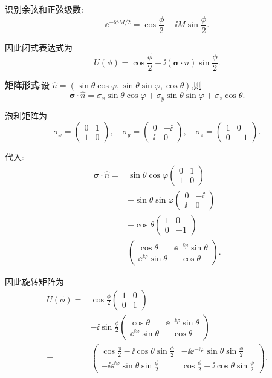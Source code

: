 \begin{question}
\begin{solution}
	识别余弦和正弦级数:
	\[
	\ee^{-\ii\phi M/2} = \cos\frac{\phi}{2} - \ii M\sin\frac{\phi}{2}.
	\]

	因此闭式表达式为
	\[
	\boxed{U(\phi) = \cos\frac{\phi}{2} - \ii(\boldsymbol\sigma\cdot\hat n)\sin\frac{\phi}{2}}.
	\]

	\textbf{矩阵形式}:设 $\hat n = (\sin\theta\cos\varphi,\sin\theta\sin\varphi,\cos\theta)$,则
	\[
	\boldsymbol\sigma\cdot\hat n = \sigma_x\sin\theta\cos\varphi + \sigma_y\sin\theta\sin\varphi + \sigma_z\cos\theta.
	\]

	泡利矩阵为
	\[
	\sigma_x = \begin{pmatrix}0&1\\1&0\end{pmatrix},\quad
	\sigma_y = \begin{pmatrix}0&-\ii\\\ii&0\end{pmatrix},\quad
	\sigma_z = \begin{pmatrix}1&0\\0&-1\end{pmatrix}.
	\]

	代入:
	\[
	\begin{aligned}
	\boldsymbol\sigma\cdot\hat n={}&\sin\theta\cos\varphi\begin{pmatrix}0&1\\1&0\end{pmatrix}\\
	&+\sin\theta\sin\varphi\begin{pmatrix}0&-\ii\\\ii&0\end{pmatrix}\\
	&+\cos\theta\begin{pmatrix}1&0\\0&-1\end{pmatrix}\\
	={}&\begin{pmatrix}\cos\theta & \ee^{-\ii\varphi}\sin\theta\\ \ee^{\ii\varphi}\sin\theta & -\cos\theta\end{pmatrix}.
	\end{aligned}
	\]

	因此旋转矩阵为
	\[
	\begin{aligned}
	U(\phi)={}&\cos\frac{\phi}{2}\begin{pmatrix}1&0\\0&1\end{pmatrix}\\
	&-\ii\sin\frac{\phi}{2}\begin{pmatrix}\cos\theta & \ee^{-\ii\varphi}\sin\theta\\ \ee^{\ii\varphi}\sin\theta & -\cos\theta\end{pmatrix}\\
	={}&\begin{pmatrix}
	\cos\frac{\phi}{2} - \ii\cos\theta\sin\frac{\phi}{2} & -\ii \ee^{-\ii\varphi}\sin\theta\sin\frac{\phi}{2}\\
	-\ii \ee^{\ii\varphi}\sin\theta\sin\frac{\phi}{2} & \cos\frac{\phi}{2} + \ii\cos\theta\sin\frac{\phi}{2}
	\end{pmatrix}.
	\end{aligned}
	\]


\end{solution}
\end{question}
